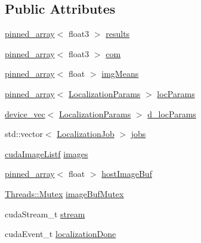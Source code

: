 \subsection*{Public Attributes}
\begin{DoxyCompactItemize}
\item 
\hyperlink{classpinned__array}{pinned\+\_\+array}$<$ float3 $>$ \hyperlink{struct_queued_c_u_d_a_tracker_1_1_stream_ab9e7576fe16b9a1f6f24b126bf3a59b3}{results}
\item 
\hyperlink{classpinned__array}{pinned\+\_\+array}$<$ float3 $>$ \hyperlink{struct_queued_c_u_d_a_tracker_1_1_stream_a58594660a26d40c9f5aa81684c247cba}{com}
\item 
\hyperlink{classpinned__array}{pinned\+\_\+array}$<$ float $>$ \hyperlink{struct_queued_c_u_d_a_tracker_1_1_stream_a6e7f0634fe87266d8dd9256746553e8c}{img\+Means}
\item 
\hyperlink{classpinned__array}{pinned\+\_\+array}$<$ \hyperlink{struct_localization_params}{Localization\+Params} $>$ \hyperlink{struct_queued_c_u_d_a_tracker_1_1_stream_a2dd71f898a23fc752d4f4db4c4525412}{loc\+Params}
\item 
\hyperlink{classdevice__vec}{device\+\_\+vec}$<$ \hyperlink{struct_localization_params}{Localization\+Params} $>$ \hyperlink{struct_queued_c_u_d_a_tracker_1_1_stream_a8dabea26c7edb25a6153e124ee93c0be}{d\+\_\+loc\+Params}
\item 
std\+::vector$<$ \hyperlink{struct_localization_job}{Localization\+Job} $>$ \hyperlink{struct_queued_c_u_d_a_tracker_1_1_stream_ad0df16e9e337079195c343a5ae3b9680}{jobs}
\item 
\hyperlink{_queued_c_u_d_a_tracker_8h_a84de79f5d4b6e4c8d5622fe712c1bd69}{cuda\+Image\+Listf} \hyperlink{struct_queued_c_u_d_a_tracker_1_1_stream_afde3d4a29b1e6d8074acb7115aee3ee0}{images}
\item 
\hyperlink{classpinned__array}{pinned\+\_\+array}$<$ float $>$ \hyperlink{struct_queued_c_u_d_a_tracker_1_1_stream_a407663bf0a868f738c9a1d210858b41b}{host\+Image\+Buf}
\item 
\hyperlink{struct_threads_1_1_mutex}{Threads\+::\+Mutex} \hyperlink{struct_queued_c_u_d_a_tracker_1_1_stream_a0365860faedfefd642a608292f43775e}{image\+Buf\+Mutex}
\item 
cuda\+Stream\+\_\+t \hyperlink{struct_queued_c_u_d_a_tracker_1_1_stream_af5b983f7fe37fab223588226b8cee4f3}{stream}
\item 
cuda\+Event\+\_\+t \hyperlink{struct_queued_c_u_d_a_tracker_1_1_stream_ad478bc8507024424451506aa1b28108a}{localization\+Done}

\end{DoxyCompactItemize}
